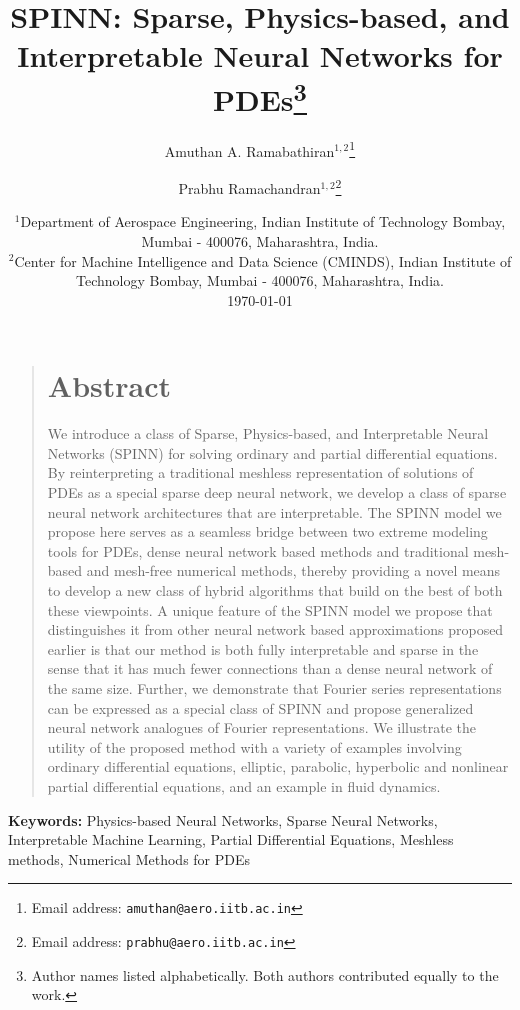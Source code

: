 \documentclass[12pt]{article}
\title{SPINN: Sparse, Physics-based, and Interpretable Neural Networks for PDEs\footnote{Author names listed alphabetically. Both authors contributed equally to the work.}}
\author{\textsf{Amuthan A. Ramabathiran}$^{1,2}$\footnote{Email address: \texttt{amuthan@aero.iitb.ac.in}} \and \textsf{Prabhu Ramachandran}$^{1,2}$\footnote{Email address: \texttt{prabhu@aero.iitb.ac.in}}}
\date{%
	$^1${\small Department of Aerospace Engineering, Indian Institute of Technology Bombay, Mumbai - 400076, Maharashtra, India.}\\[2ex]%
	$^2${\small Center for Machine Intelligence and Data Science (CMINDS), Indian Institute of Technology Bombay, Mumbai - 400076, Maharashtra, India.}\\[2ex]%
	\today
}
\providecommand{\keywords}[1]{\textbf{\textsf{Keywords:}} #1}
\begin{document}
\maketitle

\begin{quote}
\section*{Abstract}
We introduce a class of Sparse, Physics-based, and Interpretable Neural Networks (SPINN) for solving ordinary and partial differential equations. By reinterpreting a traditional meshless representation of solutions of PDEs as a special sparse deep neural network, we develop a class of sparse neural network architectures that are interpretable. The SPINN model we propose here serves as a seamless bridge between two extreme modeling tools for PDEs, dense neural network based methods and traditional mesh-based and mesh-free numerical methods, thereby providing a novel means to develop a new class of hybrid algorithms that build on the best of both these viewpoints. A unique feature of the SPINN model we propose that distinguishes it from other neural network based approximations proposed earlier is that our method is both fully interpretable and sparse in the sense that it has much fewer connections than a dense neural network of the same size. Further, we demonstrate that Fourier series representations can be expressed as a special class of SPINN and propose generalized neural network analogues of Fourier representations. We illustrate the utility of the proposed method with a variety of examples involving ordinary differential equations, elliptic, parabolic, hyperbolic and nonlinear partial differential equations, and an example in fluid dynamics.
\end{quote}


\keywords{Physics-based Neural Networks, Sparse Neural Networks, Interpretable Machine Learning, Partial Differential Equations, Meshless methods, Numerical Methods for PDEs}

\linenumbers
\end{document}
